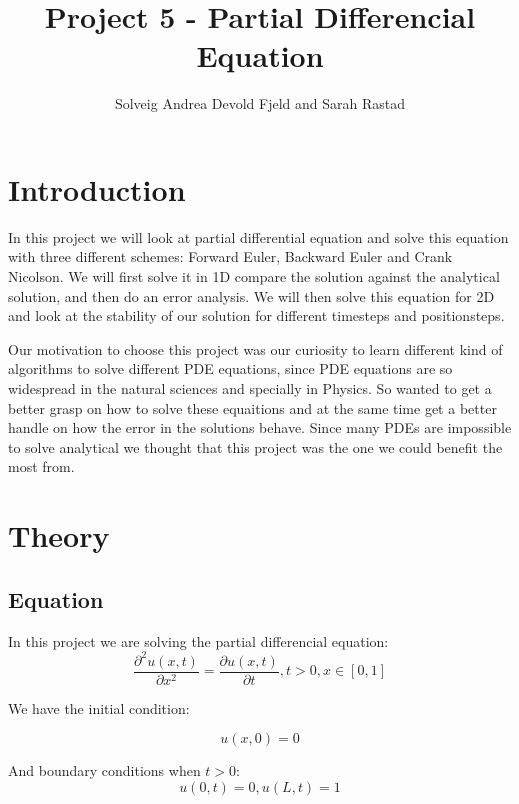 \documentclass[a4paper,10pt]{article}
\title{Project 5 - Partial Differencial Equation}
\author{Solveig Andrea Devold Fjeld and Sarah Rastad}
\begin{document}
\maketitle

\begin{abstract}

\end{abstract}

\section{Introduction}
In this project we will look at partial differential equation and solve this equation with three different schemes: Forward Euler, Backward Euler
and Crank Nicolson. We will first solve it in 1D compare the solution against the analytical solution, and then do an error analysis. We will then 
solve this equation for 2D and look at the stability of our solution for different timesteps and positionsteps. 

Our motivation to choose this project was our curiosity to learn different kind of algorithms to solve different PDE equations, since PDE equations
are so widespread in the natural sciences and specially in Physics. So wanted to get a better grasp on how to solve these equaitions and at the same time
get a better handle on how the error in the solutions behave. Since many PDEs are impossible to solve analytical we thought that this project
was the one we could benefit the most from.

\section{Theory}
\subsection{Equation}
In this project we are solving the partial differencial equation:
\begin{equation}
  \frac{\partial^2 u(x,t)}{\partial x^2} =\frac{\partial u(x,t)}{\partial t}, t> 0, x\in [0,1]
  \label{eq:PartDiff}
\end{equation}

We have the initial condition:

\begin{equation}
 u(x,0) = 0
\end{equation}

And boundary conditions when $t>0$:
\begin{equation}
 u(0,t) = 0,
 u(L,t) = 1
\end{equation}
\end{document}

